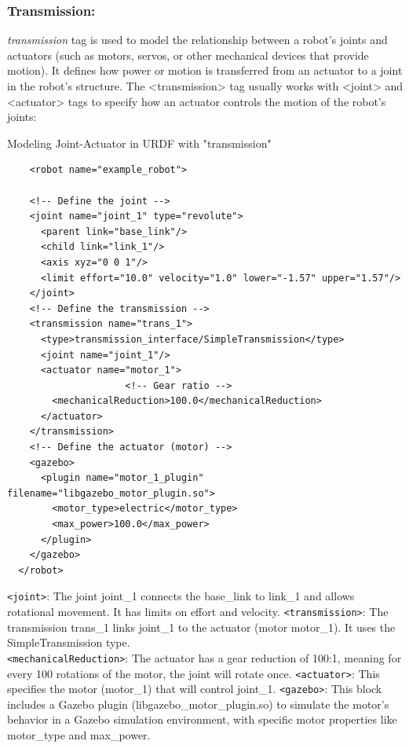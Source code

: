 \documentclass[../../main]{subfiles}
\begin{document}
\subsubsection{Transmission:}
\emph{transmission} tag is used to model the relationship between a robot's joints and actuators 
(such as motors, servos, or other mechanical devices that provide motion). 
It defines how power or motion is transferred from an actuator to a joint in the robot's structure.
The <transmission> tag usually works with <joint> and <actuator> tags to specify how an actuator controls the motion of the robot's joints:

\begin{codebox}[]{Modeling Joint-Actuator in URDF with "transmission"}
  \begin{verbatim}
    <robot name="example_robot">

    <!-- Define the joint -->
    <joint name="joint_1" type="revolute">
      <parent link="base_link"/>
      <child link="link_1"/>
      <axis xyz="0 0 1"/>
      <limit effort="10.0" velocity="1.0" lower="-1.57" upper="1.57"/>
    </joint>
    <!-- Define the transmission -->
    <transmission name="trans_1">
      <type>transmission_interface/SimpleTransmission</type>
      <joint name="joint_1"/>
      <actuator name="motor_1">
                     <!-- Gear ratio -->
        <mechanicalReduction>100.0</mechanicalReduction>
      </actuator>
    </transmission>
    <!-- Define the actuator (motor) -->
    <gazebo>
      <plugin name="motor_1_plugin" filename="libgazebo_motor_plugin.so">
        <motor_type>electric</motor_type>
        <max_power>100.0</max_power>
      </plugin>
    </gazebo>
  </robot>
\end{verbatim}
  \end{codebox}
\lstinline!<joint>!: The joint joint\_1 connects the base\_link to link\_1 and allows rotational movement. 
It has limits on effort and velocity.
\lstinline!<transmission>!: The transmission trans\_1 links joint\_1 to the actuator (motor motor\_1). It uses the SimpleTransmission type.\\
\lstinline!<mechanicalReduction>!: The actuator has a gear reduction of 100:1, meaning for every 100 rotations of the motor, the joint will rotate once.
\lstinline!<actuator>!: This specifies the motor (motor\_1) that will control joint\_1.
\lstinline!<gazebo>!: This block includes a Gazebo plugin (libgazebo\_motor\_plugin.so) to simulate the motor’s behavior in a Gazebo simulation environment, with specific motor properties like motor\_type and max\_power.
\end{document}
